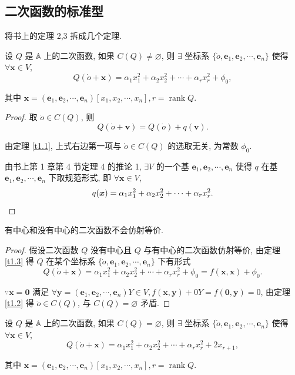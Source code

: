 \documentclass{ctexart}
\begin{document}
\subsection{二次函数的标准型}
将书上的定理 2,3 拆成几个定理.
\begin{theorem}\label{t1.3}
    设 $Q$ 是 $\mathbb{A}$ 上的二次函数, 如果 $C(Q)\neq\varnothing$, 则 $\exists$ 坐标系 $\{\dot{o},\boldsymbol{e}_1,\boldsymbol{e}_2,\cdots,\boldsymbol{e}_n\}$ 使得 $\forall\boldsymbol{x}\in V$,
    \[Q(\dot{o}+\boldsymbol{x})=\alpha_1x^2_1+\alpha_2x^2_2+\cdots+\alpha_rx^2_r+\phi_0,\]

    其中 $\boldsymbol{x}=(\boldsymbol{e}_1,\boldsymbol{e}_2,\cdots,\boldsymbol{e}_n)[x_1,x_2,\cdots,x_n],r=\operatorname{rank}Q$.
\end{theorem}
\begin{proof}
    取 $\dot{o}\in C(Q)$, 则
    \[Q(\dot{o}+\boldsymbol{v})=Q(\dot{o})+q(\boldsymbol{v}).\]

    由定理 \ref{t1.1}, 上式右边第一项与 $\dot{o}\in C(Q)$ 的选取无关, 为常数 $\phi_0$.

    由书上第 1 章第 4 节定理 4 的推论 1, $\exists V$ 的一个基 $\boldsymbol{e}_1,\boldsymbol{e}_2,\cdots,\boldsymbol{e}_n$ 使得 $q$ 在基 $\boldsymbol{e}_1,\boldsymbol{e}_2,\cdots,\boldsymbol{e}_n$ 下取规范形式, 即 $\forall\boldsymbol{x}\in V$,
    \[q(\boldsymbol{x})=\alpha_1x^2_1+\alpha_2x^2_2+\cdots+\alpha_rx^2_r.\qedhere\]
\end{proof}
\begin{lemma}\label{l1.1}
    有中心和没有中心的二次函数不会仿射等价.
\end{lemma}
\begin{proof}
    假设二次函数 $Q$ 没有中心且 $Q$ 与有中心的二次函数仿射等价, 由定理 \ref{t1.3} 得 $Q$ 在某个坐标系 $\{\dot{o},\boldsymbol{e}_1,\boldsymbol{e}_2,\cdots,\boldsymbol{e}_n\}$ 下有形式
    \[Q(\dot{o}+\boldsymbol{x})=\alpha_1x^2_1+\alpha_2x^2_2+\cdots+\alpha_rx^2_r+\phi_0=f(\boldsymbol{x},\boldsymbol{x})+\phi_0.\]

    $\because\boldsymbol{x}=\boldsymbol{0}$ 满足 $\forall\boldsymbol{y}=(\boldsymbol{e}_1,\boldsymbol{e}_2,\cdots,\boldsymbol{e}_n)Y\in V,f(\boldsymbol{x},\boldsymbol{y})+0Y=f(\boldsymbol{0},\boldsymbol{y})=0$, 由定理 \ref{t1.2} 得 $\dot{o}\in C(Q)$, 与 $C(Q)=\varnothing$ 矛盾.
\end{proof}
\begin{theorem}
    设 $Q$ 是 $\mathbb{A}$ 上的二次函数, 如果 $C(Q)=\varnothing$, 则 $\exists$ 坐标系 $\{\dot{o},\boldsymbol{e}_1,\boldsymbol{e}_2,\cdots,\boldsymbol{e}_n\}$ 使得 $\forall\boldsymbol{x}\in V$,
    \[Q(\dot{o}+\boldsymbol{x})=\alpha_1x^2_1+\alpha_2x^2_2+\cdots+\alpha_rx^2_r+2x_{r+1},\]

    其中 $\boldsymbol{x}=(\boldsymbol{e}_1,\boldsymbol{e}_2,\cdots,\boldsymbol{e}_n)[x_1,x_2,\cdots,x_n],r=\operatorname{rank}Q$.
\end{theorem}
\end{document}
